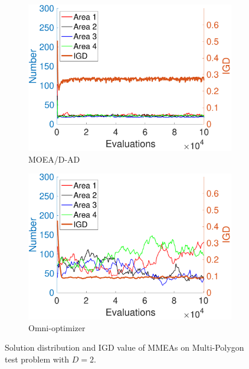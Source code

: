 \documentclass[conference]{IEEEtran}
\begin{document}
\begin{figure}[htbp]
    \begin{subfigure}[b]{.22\textwidth}
    \includegraphics[width=\linewidth]{Section5/dim2/Diversity/MOEADAD}
    \caption{MOEA/D-AD}
    \end{subfigure}
    \begin{subfigure}[b]{.22\textwidth}
    \includegraphics[width=\linewidth]{Section5/dim2/Diversity/OmniOptimizer}
    \caption{Omni-optimizer}
    \end{subfigure}
    \caption{Solution distribution and IGD value of MMEAs on Multi-Polygon test problem with $D=2$.}
    \label{fig: MMEAs PS dim=2}
\end{figure}
\end{document}
